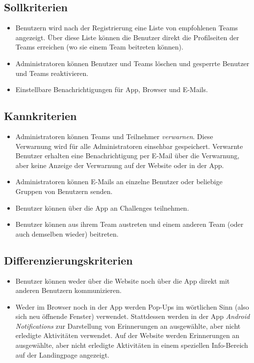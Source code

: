 \documentclass[10pt,a4paper]{article}
\begin{document}
	\subsection{Sollkriterien}
	\begin{itemize}
			\item Benutzern wird nach der Registrierung eine Liste von empfohlenen Teams angezeigt. Über diese Liste können die Benutzer direkt die Profilseiten der Teams erreichen (wo sie einem Team beitreten können).
			\item Administratoren können Benutzer und Teams löschen und gesperrte Benutzer und Teams reaktivieren.
			\item Einstellbare Benachrichtigungen für App, Browser und E-Mails.
		\end{itemize}
	\subsection{Kannkriterien}
	\begin{itemize}
                        \item Administratoren können Teams und Teilnehmer \emph{verwarnen}. Diese Verwarnung wird für alle Administratoren einsehbar gespeichert. Verwarnte Benutzer erhalten eine Benachrichtigung per E-Mail über die Verwarnung, aber keine Anzeige der Verwarnung auf der Website oder in der App.
			\item Administratoren können E-Mails an einzelne Benutzer oder beliebige Gruppen von Benutzern senden.
                        \item Benutzer können über die App an Challenges teilnehmen.
                        \item Benutzer können aus ihrem Team austreten und einem anderen Team (oder auch demselben wieder) beitreten.
	\end{itemize}
	\subsection{Differenzierungskriterien}
	\begin{itemize}
		\item Benutzer können weder über die Website noch über die App direkt mit anderen Benutzern kommunizieren.
		\item Weder im Browser noch in der App werden Pop-Ups im wörtlichen Sinn (also sich neu öffnende Fenster) verwendet. Stattdessen werden in der App \emph{Android Notifications} zur Darstellung von Erinnerungen an ausgewählte, aber nicht erledigte Aktivitäten verwendet. Auf der Website werden Erinnerungen an ausgewählte, aber nicht erledigte Aktivitäten in einem speziellen Info-Bereich auf der Landingpage angezeigt. 
	\end{itemize}
\end{document}
